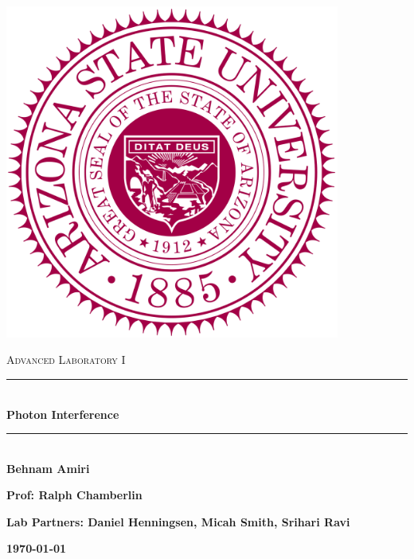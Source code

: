 \documentclass[fleqn]{article}
\begin{document}
  \begin{titlepage}

    \newcommand{\HRule}{\rule{\linewidth}{0.5mm}}

    \center

    \begin{center}
      \includegraphics[height=11cm, width=11cm]{asu.png}
    \end{center}

    \vline

    \textsc{\LARGE Advanced Laboratory I}\\[1.5cm]

    \HRule \\[0.5cm]
    { \huge \bfseries Photon Interference}\\[0.4cm] 
    \HRule \\[1.0cm]

    \textbf{Behnam Amiri}

    \bigbreak

    \textbf{Prof: Ralph Chamberlin}

    \bigbreak

    \textbf{Lab Partners: Daniel Henningsen, Micah Smith, Srihari Ravi}

    \bigbreak

    \textbf{{\large \today}\\[2cm]}

    \vfill

  \end{titlepage}
\end{document}
